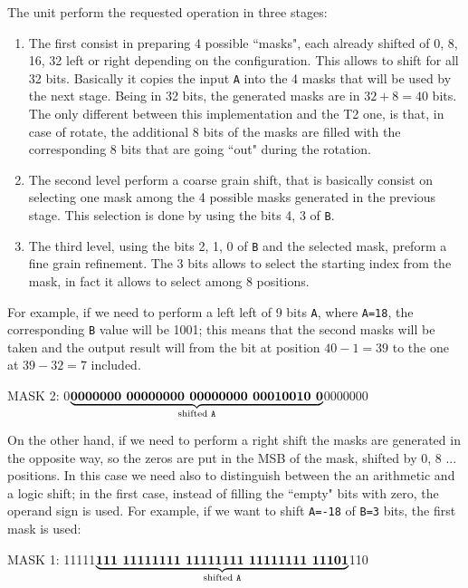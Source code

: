  The unit perform the requested operation in three stages:
\begin{enumerate}
	\item The first consist in preparing 4 possible ``masks", each already shifted of {0, 8, 16, 32} left
	or right depending on the configuration. This allows to shift for all 32 bits. Basically it copies
	the input \texttt{A} into the 4 masks that will be used by the next stage. Being in 32 bits, the generated masks are in $32+8=40$ bits. The only different between this implementation and the T2 one, is that, in case of rotate, the additional 8 bits of the masks are filled with the corresponding 8 bits that are going ``out" during the rotation.
	
	\item The second level perform a coarse grain shift, that is basically consist on selecting one mask
	among the 4 possible masks generated in the previous stage. This selection is done by using the bits {4, 3} of \texttt{B}.
	\item The third level, using the bits {2, 1, 0} of \texttt{B} and the selected mask, preform a fine grain refinement. The 3 bits allows to select the starting index from the mask, in fact it allows to select among 8 positions.
\end{enumerate}
	
For example, if we need to perform a left left of 9 bits \texttt{A}, where \texttt{A=18}, the corresponding \texttt{B} value will be 1001; this means that the second masks will be taken and the output result will from the bit at position $40-1=39$ to the one at $39-32=7$ included.
\begin{center}
	MASK 2: 0$\underbrace{\textbf{0000000 00000000 00000000 00010010 0}}_{\text{shifted \texttt{A}}}$0000000
\end{center}

On the other hand, if we need to perform a right shift the masks are generated in the opposite way, so the zeros are put in the MSB of the mask, shifted by 0, 8 ... positions. In this case we need also to distinguish between the an arithmetic and a logic shift; in the first case, instead of filling the ``empty" bits with zero, the operand sign is used. For example, if we want to shift \texttt{A=-18} of \texttt{B=3} bits, the first mask is used: 
\begin{center}
	MASK 1: 11111$\underbrace{\textbf{111 11111111 11111111 11111111 11101}}_{\text{shifted \texttt{A}}}$110
\end{center}

